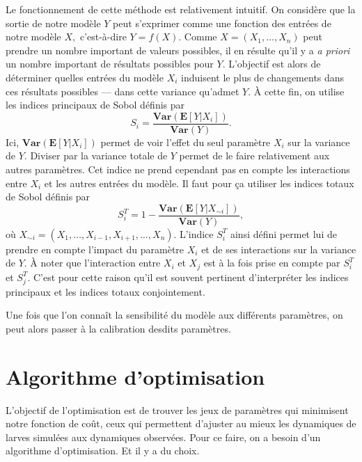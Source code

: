 Le fonctionnement de cette méthode est relativement intuitif.
On considère que la sortie de notre modèle $Y$ peut s'exprimer comme une fonction des entrées de notre modèle $X,$ c'est-à-dire $Y = f(X)$.
Comme $X = \left( X_1, \ldots, X_n \right)$ peut prendre un nombre important de valeurs possibles, il en résulte qu'il y a \emph{a priori} un nombre important de résultats possibles pour $Y.$
L'objectif est alors de déterminer quelles entrées du modèle $X_i$ induisent le plus de changements dans ces résultats possibles --- dans cette variance qu'admet $Y.$
À cette fin, on utilise les indices principaux de Sobol définis par
\[
S_i = \frac{\textbf{Var}\!\left( \mathbf{E}\!\left[Y|X_i\right] \right)}{\textbf{Var}\!\left( Y \right)}.
\]
Ici, $\textbf{Var}\!\left( \mathbf{E}\left[Y|X_i\right] \right)$ permet de voir l'effet du seul paramètre $X_i$ sur la variance de $Y.$
Diviser par la variance totale de $Y$ permet de le faire relativement aux autres paramètres.
Cet indice ne prend cependant pas en compte les interactions entre $X_i$ et les autres entrées du modèle. 
Il faut pour ça utiliser les indices totaux de Sobol définis par
\[
S^T_i = 1 - \frac{\textbf{Var}\!\left( \mathbf{E}\!\left[Y|X_{\sim i}\right] \right)}{\textbf{Var}\!\left( Y \right)},
\]
où $X_{\sim i} = \left(X_1, \ldots, X_{i-1}, X_{i+1}, \ldots, X_n \right)$.
L'indice $S^T_i$ ainsi défini permet lui de prendre en compte l'impact du paramètre $X_i$ et de ses interactions sur la variance de $Y$.
À noter que l'interaction entre $X_i$ et $X_j$ est à la fois prise en compte par $S^T_i$ et $S^T_j$.
C'est pour cette raison qu'il est souvent pertinent d'interpréter les indices principaux et les indices totaux conjointement.

Une fois que l'on connaît la sensibilité du modèle aux différents paramètres, on peut alors passer à la calibration desdits paramètres.


\section{Algorithme d'optimisation}

L'objectif de l'optimisation est de trouver les jeux de paramètres qui minimisent notre fonction de coût, ceux qui permettent d'ajuster au mieux les dynamiques de larves simulées aux dynamiques observées.
Pour ce faire, on a besoin d'un algorithme d'optimisation.
Et il y a du choix.

